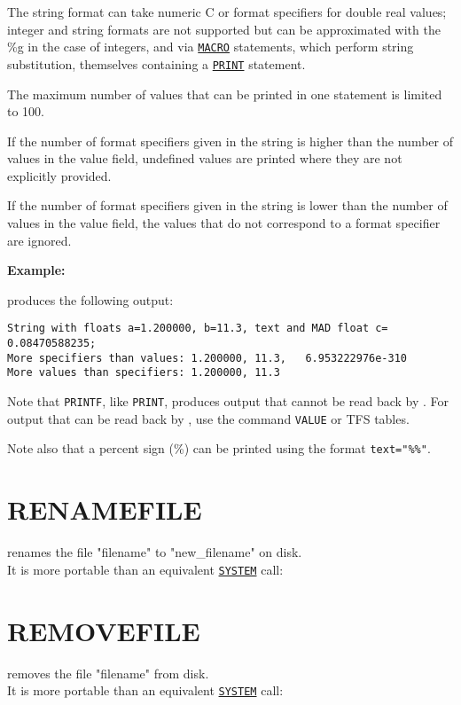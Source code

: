 The string format can take numeric C or \madx format specifiers for
double real values; integer and string formats are not supported but 
can be approximated with the \%g in the case of integers, and via
\hyperref[sec:macro]{\tt MACRO} statements, which perform string
substitution, themselves containing a \hyperref[sec:print]{\tt PRINT}
statement.  

The maximum number of values that can be printed in one
statement is limited to 100. 

If the number of format specifiers given in the string is higher 
than the number of values in the value field, undefined values are printed 
where they are not explicitly provided. 

If the number of format specifiers given in the string is lower 
than the number of values in the value field, the values that 
do not correspond to a format specifier are ignored. 


{\bf Example:}

produces the following output:
\begin{verbatim}
String with floats a=1.200000, b=11.3, text and MAD float c=     0.08470588235;
More specifiers than values: 1.200000, 11.3,   6.953222976e-310
More values than specifiers: 1.200000, 11.3
\end{verbatim}

Note that {\tt PRINTF}, like {\tt PRINT}, produces output that
cannot be read back by \madx. For output that can be read back by \madx,
use the command {\tt VALUE} or TFS tables.

Note also that a percent sign (\%) can be printed using the format
\verb|text="%%"|. 


\section{RENAMEFILE}
\label{sec:renamefile}
renames the file "filename" to "new\_filename" on disk. \\
It is more portable than an equivalent \hyperref[sec:system]{\tt SYSTEM} call:

\section{REMOVEFILE}
\label{sec:removefile}
removes the file "filename" from disk. \\
It is more portable than an equivalent \hyperref[sec:system]{\tt SYSTEM} call: 



